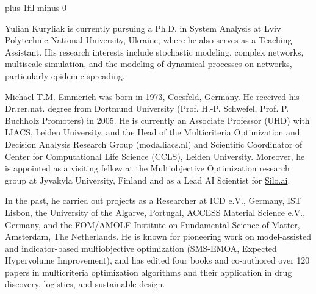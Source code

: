 \documentclass{ieeeaccess}
\begin{document}


\patchcmd{\IEEEbiographynophoto}
  {\baselineskip plus 1fil minus 0\baselineskip}
  {\baselineskip}
  {}{\PackageError{manuscript}{Biography spacing patch failed}{Check the IEEE Access class.}}
\raggedbottom
\begin{IEEEbiographynophoto}{Yulian Kuryliak}
is currently pursuing a Ph.D. in System Analysis at Lviv Polytechnic National University, Ukraine, where he also serves as a Teaching Assistant.
His research interests include stochastic modeling, complex networks, multiscale simulation, and the modeling of dynamical processes on networks, particularly epidemic spreading.
\end{IEEEbiographynophoto}

\begin{IEEEbiographynophoto}{Michael T.M. Emmerich}
was born in 1973, Coesfeld, Germany. He received his Dr.rer.nat. degree from Dortmund University (Prof. H.-P. Schwefel, Prof. P. Buchholz Promoters) in 2005. He is currently an Associate Professor (UHD) with LIACS, Leiden University, and the Head of the Multicriteria Optimization and Decision Analysis Research Group (moda.liacs.nl) and Scientific Coordinator of Center for Computational Life Science (CCLS), Leiden University. Moreover, he is appointed as a visiting fellow at the Multiobjective Optimization research group at Jyvakyla University, Finland and as a Lead AI Scientist for \url{Silo.ai}.

In the past, he carried out projects as a Researcher at ICD e.V., Germany, IST Lisbon, the University of the Algarve, Portugal, ACCESS Material Science e.V., Germany, and the FOM/AMOLF Institute on Fundamental Science of Matter, Amsterdam, The Netherlands. He is known for pioneering work on model-assisted and indicator-based multiobjective optimization (SMS-EMOA, Expected Hypervolume Improvement), and has edited four books and co-authored over 120 papers in multicriteria optimization algorithms and their application in drug discovery, logistics, and sustainable design.
\end{IEEEbiographynophoto}

\EOD
\end{document}
